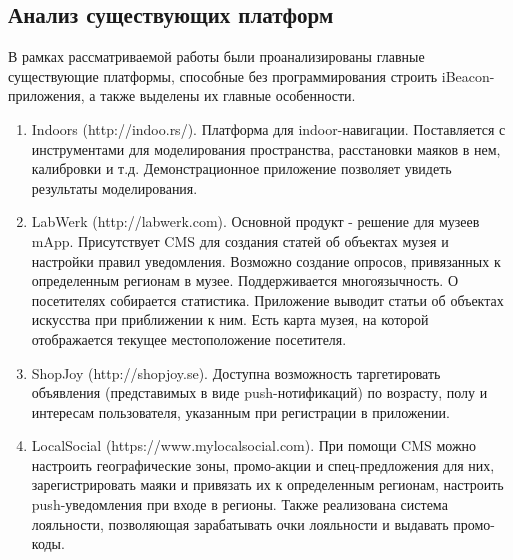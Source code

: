 \subsection{Анализ существующих платформ}

В рамках рассматриваемой работы были проанализированы главные существующие платформы, способные без программирования строить iBeacon-приложения, а также выделены их главные особенности.

\begin{enumerate}
    \item
    Indoors (http://indoo.rs/). Платформа для indoor-навигации. Поставляется с инструментами для моделирования пространства, расстановки маяков в нем, калибровки и т.д. Демонстрационное приложение позволяет увидеть результаты моделирования.
    \item
    LabWerk (http://labwerk.com). Основной продукт - решение для музеев mApp. Присутствует CMS для создания статей об объектах музея и настройки правил уведомления. Возможно создание опросов, привязанных к определенным регионам в музее. Поддерживается многоязычность. О посетителях собирается статистика. Приложение выводит статьи об объектах искусства при приближении к ним. Есть карта музея, на которой отображается текущее местоположение посетителя.
    \item
    ShopJoy (http://shopjoy.se). Доступна возможность таргетировать объявления (представимых в виде push-нотификаций) по возрасту, полу и интересам пользователя, указанным при регистрации в приложении.
    \item
    LocalSocial (https://www.mylocalsocial.com). При помощи CMS можно настроить географические зоны, промо-акции и спец-предложения для них, зарегистрировать маяки и привязать их к определенным регионам, настроить push-уведомления при входе в регионы. Также реализована система лояльности, позволяющая зарабатывать очки лояльности и выдавать промо-коды.
\end{enumerate}